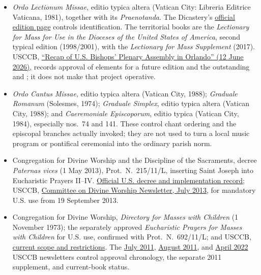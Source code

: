 \begin{itemize}
  \item \emph{Ordo Lectionum Missae}, editio typica altera (Vatican City: Libreria Editrice Vaticana, 1981), together with its \emph{Praenotanda}. The Dicastery's \href{https://www.cultodivino.va/en/formazione/pubblicazioni/libri-liturgici/missale/ordo-lectionum-missae.html}{official edition page} controls identification. The territorial books are the \emph{Lectionary for Mass for Use in the Dioceses of the United States of America}, second typical edition (1998/2001), with the \emph{Lectionary for Mass Supplement} (2017). USCCB, \href{https://www.usccb.org/news/2026/recap-us-bishops-plenary-assembly-orlando}{``Recap of U.S. Bishops' Plenary Assembly in Orlando'' (12 June 2026)}, records approval of elements for a future edition and the outstanding  and ; it does not make that project operative.
  \item \emph{Ordo Cantus Missae}, editio typica altera (Vatican City, 1988); \emph{Graduale Romanum} (Solesmes, 1974); \emph{Graduale Simplex}, editio typica altera (Vatican City, 1988); and \emph{Caeremoniale Episcoporum}, editio typica (Vatican City, 1984), especially nos.~74 and 141. These control chant ordering and the episcopal branches actually invoked; they are not used to turn a local music program or pontifical ceremonial into the ordinary parish norm.
  \item Congregation for Divine Worship and the Discipline of the Sacraments, decree \emph{Paternas vices} (1 May 2013), Prot.~N.~215/11/L, inserting Saint Joseph into Eucharistic Prayers II--IV. \href{https://www.usccb.org/prayer-and-worship/the-mass/order-of-mass/liturgy-of-the-eucharist/saint-joseph-in-the-eucharistic-prayers}{Official U.S. decree and implementation record}; USCCB, \href{https://www.usccb.org/resources/newsletter-2013-07.pdf}{Committee on Divine Worship Newsletter, July 2013}, for mandatory U.S. use from 19 September 2013.
  \item Congregation for Divine Worship, \emph{Directory for Masses with Children} (1 November 1973); the separately approved \emph{Eucharistic Prayers for Masses with Children} for U.S. use, confirmed with Prot.~N.~692/11/L; and USCCB, \href{https://www.usccb.org/prayer-and-worship/the-mass/order-of-mass/liturgy-of-the-eucharist/eucharistic-prayer-for-masses-with-children}{current scope and restrictions}. The \href{https://www.usccb.org/resources/newsletter-2011-07.pdf}{July 2011}, \href{https://www.usccb.org/resources/newsletter-2011-08.pdf}{August 2011}, and \href{https://www.usccb.org/resources/newsletter-2022-04.pdf}{April 2022} USCCB newsletters control approval chronology, the separate 2011 supplement, and current-book status.

\end{itemize}
